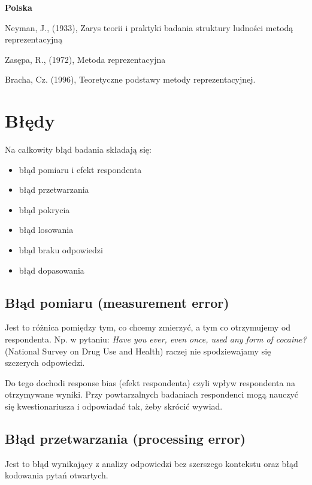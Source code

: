 \documentclass[
]{book}
\providecommand{\tightlist}{%
  \setlength{\itemsep}{0pt}\setlength{\parskip}{0pt}}
\begin{document}
\textbf{Polska}

Neyman, J., (1933), Zarys teorii i praktyki badania struktury ludności metodą reprezentacyjną

Zasępa, R., (1972), Metoda reprezentacyjna

Bracha, Cz. (1996), Teoretyczne podstawy metody reprezentacyjnej.

\hypertarget{bux142ux119dy}{%
\section{Błędy}\label{bux142ux119dy}}

Na całkowity błąd badania składają się:

\begin{itemize}
\tightlist
\item
  błąd pomiaru i efekt respondenta
\item
  błąd przetwarzania
\item
  błąd pokrycia
\item
  błąd losowania
\item
  błąd braku odpowiedzi
\item
  błąd dopasowania
\end{itemize}

\hypertarget{bux142ux105d-pomiaru-measurement-error}{%
\subsection{Błąd pomiaru (measurement error)}\label{bux142ux105d-pomiaru-measurement-error}}

Jest to różnica pomiędzy tym, co chcemy zmierzyć, a tym co otrzymujemy od respondenta. Np. w pytaniu: \emph{Have you ever, even once, used any form of cocaine?} (National Survey on Drug Use and Health) raczej nie spodziewajamy się szczerych odpowiedzi.

Do tego dochodi response bias (efekt respondenta) czyli wpływ respondenta na otrzymywane wyniki. Przy powtarzalnych badaniach respondenci mogą nauczyć się kwestionariusza i odpowiadać tak, żeby skrócić wywiad.

\hypertarget{bux142ux105d-przetwarzania-processing-error}{%
\subsection{Błąd przetwarzania (processing error)}\label{bux142ux105d-przetwarzania-processing-error}}

Jest to błąd wynikający z analizy odpowiedzi bez szerszego kontekstu oraz błąd kodowania pytań otwartych.
\end{document}
